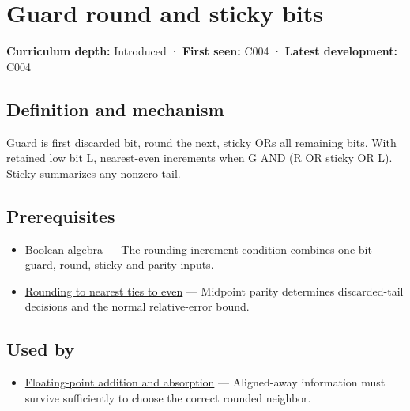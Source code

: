 \hypertarget{appendix-b572b631069b}{}\label{referencestart:appendix-b572b631069b}
\section{Guard round and sticky bits}\label{appendix-b572b631069b-guard-round-and-sticky-bits}

\textbf{Curriculum depth:} Introduced · \textbf{First seen:} C004 · \textbf{Latest development:} C004

\begin{allmightroledefinition}

\subsection{Definition and mechanism}\label{appendix-b572b631069b-definition-and-mechanism}

Guard is first discarded bit, round the next, sticky ORs all remaining bits. With retained low bit L, nearest-even increments when G AND (R OR sticky OR L). Sticky summarizes any nonzero tail.

\end{allmightroledefinition}

\subsection{Prerequisites}\label{appendix-b572b631069b-prerequisites}

\begin{itemize}
\tightlist
\item
  \hyperref[appendix-24475e1596a8]{Boolean algebra} --- The rounding increment condition combines one-bit guard, round, sticky and parity inputs.
\item
  \hyperref[appendix-614afe1de592]{Rounding to nearest ties to even} --- Midpoint parity determines discarded-tail decisions and the normal relative-error bound.
\end{itemize}

\subsection{Used by}\label{appendix-b572b631069b-used-by}

\begin{itemize}
\tightlist
\item
  \hyperref[appendix-a1b1b4580dfd]{Floating-point addition and absorption} --- Aligned-away information must survive sufficiently to choose the correct rounded neighbor.
\end{itemize}

